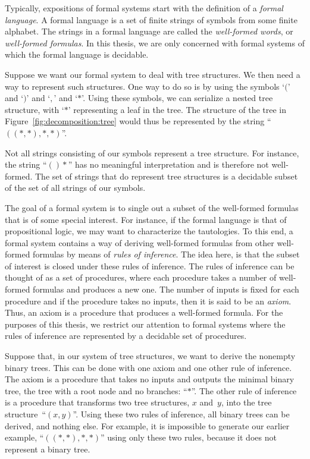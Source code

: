 Typically, expositions of formal systems start with the definition of a \emph{formal language}.
A formal language is a set of finite strings of symbols from some finite alphabet.
The strings in a formal language are called the \emph{well-formed words}, or \emph{well-formed formulas}.
In this thesis, we are only concerned with formal systems of which the formal language is decidable.
\begin{example}
  Suppose we want our formal system to deal with tree structures.
  We then need a way to represent such structures.
  One way to do so is by using the symbols `$($' and `$)$' and `$,$' and `$\ast$'.
  Using these symbols, we can serialize a nested tree structure, with `$\ast$' representing a leaf in the tree.
  The structure of the tree in Figure~\ref{fig:decomposition:tree} would thus be represented by the string \enquote{$((\ast, \ast), \ast, \ast)$}.

  Not all strings consisting of our symbols represent a tree structure.
  For instance, the string \enquote{$()\ast$} has no meaningful interpretation and is therefore not well-formed.
  The set of strings that do represent tree structures is a decidable subset of the set of all strings of our symbols.
\end{example}

The goal of a formal system is to single out a subset of the well-formed formulas that is of some special interest.
For instance, if the formal language is that of propositional logic, we may want to characterize the tautologies.
To this end, a formal system contains a way of deriving well-formed formulas from other well-formed formulas by means of \emph{rules of inference}.
The idea here, is that the subset of interest is closed under these rules of inference.
The rules of inference can be thought of as a set of procedures, where each procedure takes a number of well-formed formulas and produces a new one.
The number of inputs is fixed for each procedure and if the procedure takes no inputs, then it is said to be an \emph{axiom}.
Thus, an axiom is a procedure that produces a well-formed formula.
For the purposes of this thesis, we restrict our attention to formal systems where the rules of inference are represented by a decidable set of procedures.
\begin{example}[continued]
  Suppose that, in our system of tree structures, we want to derive the nonempty binary trees.
  This can be done with one axiom and one other rule of inference.
  The axiom is a procedure that takes no inputs and outputs the minimal binary tree, the tree with a root node and no branches: \enquote{$\ast$}.
  The other rule of inference is a procedure that transforms two tree structures, $x$ and~$y$, into the tree structure~\enquote{$(x, y)$}.
  Using these two rules of inference, all binary trees can be derived, and nothing else.
  For example, it is impossible to generate our earlier example, \enquote{$((\ast, \ast), \ast, \ast)$} using only these two rules, because it does not represent a binary tree.
\end{example}

